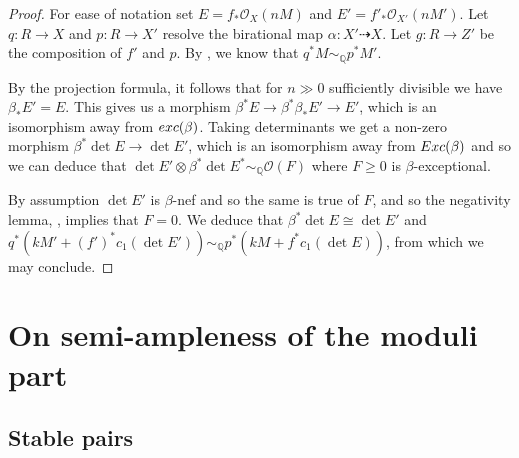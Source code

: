 \documentclass[12pt]{amsart}
\theoremstyle{plain}
\theoremstyle{definition}
\def\det{\operatorname{det}}
\begin{document}
\begin{proof}
For ease of notation set $E = f_*\mathcal O_X(nM)$ and $E' = f'_*\mathcal O_{X'}(nM')$.
Let $q\colon R \rightarrow X$ and $p\colon R \rightarrow X'$ resolve the birational map $\alpha \colon X' \dashrightarrow X$.
Let $g\colon R \rightarrow Z'$ be the composition of $f'$ and $p$.
By \cite[Proposition 2.21]{ACSS}, we know that $q^*M \sim_{\mathbb Q} p^*M'$.

By the projection formula,
it follows that for $n \gg 0$ sufficiently divisible we have $\beta_*E' = E$.
This gives us a morphism 
$\beta^*E \rightarrow \beta^*\beta_*E' \rightarrow E'$, which is an isomorphism away from ${\rm exc}(\beta)$.
Taking determinants we get a non-zero morphism $\beta^*\det E \rightarrow \det E'$, which is an isomorphism
away from ${\rm Exc}(\beta)$ and so we can deduce that 
$\det E' \otimes \beta^*\det E^* \sim_{\mathbb Q} \mathcal O(F)$ where $F \geq 0$ is $\beta$-exceptional.



By assumption $\det E'$ is $\beta$-nef and so the same is true of $F$, and so 
the negativity lemma, \cite[Lemma 3.39]{KM98}, implies that $F = 0$.
We deduce that  $\beta^*\det E \cong \det E'$ and
$q^*(kM'+(f')^*c_1(\det E')) \sim_{\mathbb Q} p^*(kM+f^*c_1(\det E))$,
from which we may conclude.
\end{proof}





\section{On semi-ampleness of the moduli part}



\subsection{Stable pairs}
\end{document}
